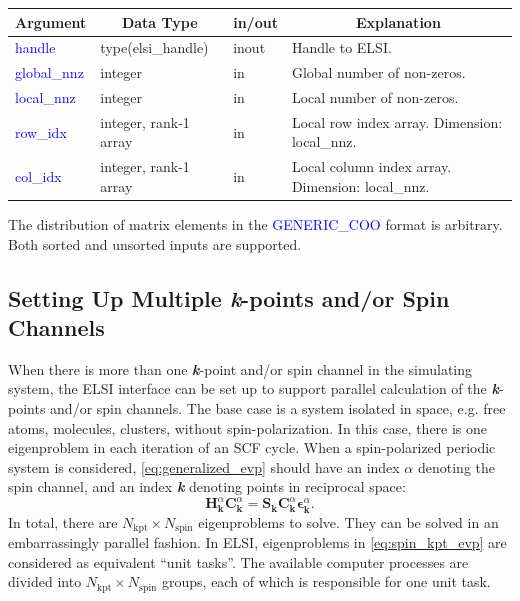 \documentclass{report}
\begin{document}
\begin{tabular}[]{|p{30mm}|p{35mm}|p{15mm}|p{85mm}|}
\hline
\multicolumn{1}{|c|}{\textbf{Argument}} & \multicolumn{1}{c|}{\textbf{Data Type}} & \multicolumn{1}{c|}{\textbf{in/out}} & \multicolumn{1}{c|}{\textbf{Explanation}}\\
\hline
\textcolor{blue}{handle}      & type(elsi\_handle)    & inout & Handle to ELSI.\\
\hline
\textcolor{blue}{global\_nnz} & integer               & in    & Global number of non-zeros.\\
\hline
\textcolor{blue}{local\_nnz}  & integer               & in    & Local number of non-zeros.\\
\hline
\textcolor{blue}{row\_idx}    & integer, rank-1 array & in    & Local row index array.  Dimension: local\_nnz.\\
\hline
\textcolor{blue}{col\_idx}    & integer, rank-1 array & in    & Local column index array.  Dimension: local\_nnz.\\
\hline
\end{tabular}

The distribution of matrix elements in the \textcolor{blue}{GENERIC\_COO} format is arbitrary.  Both sorted and unsorted inputs are supported.

\subsection{Setting Up Multiple \textbf{\textit{k}}-points and/or Spin Channels}
\label{subsec:setup_kpt}
When there is more than one \textbf{\textit{k}}-point and/or spin channel in the simulating system, the ELSI interface can be set up to support parallel calculation of the \textbf{\textit{k}}-points and/or spin channels.  The base case is a system isolated in space, e.g. free atoms, molecules, clusters, without spin-polarization.  In this case, there is one eigenproblem in each iteration of an SCF cycle.  When a spin-polarized periodic system is considered, \ref{eq:generalized_evp} should have an index $\alpha$ denoting the spin channel, and an index \textbf{\textit{k}} denoting points in reciprocal space:
\begin{equation}
\label{eq:spin_kpt_evp}
\boldsymbol{H}_{\boldsymbol{k}}^\alpha \boldsymbol{C}_{\boldsymbol{k}}^\alpha = \boldsymbol{S}_{\boldsymbol{k}} \boldsymbol{C}_{\boldsymbol{k}}^\alpha \boldsymbol{\epsilon}_{\boldsymbol{k}}^\alpha .
\end{equation}
In total, there are $N_\text{kpt} \times N_\text{spin}$ eigenproblems to solve.  They can be solved in an embarrassingly parallel fashion.  In ELSI, eigenproblems in \ref{eq:spin_kpt_evp} are considered as equivalent ``unit tasks''.  The available computer processes are divided into $N_\text{kpt} \times N_\text{spin}$ groups, each of which is responsible for one unit task.
\end{document}
